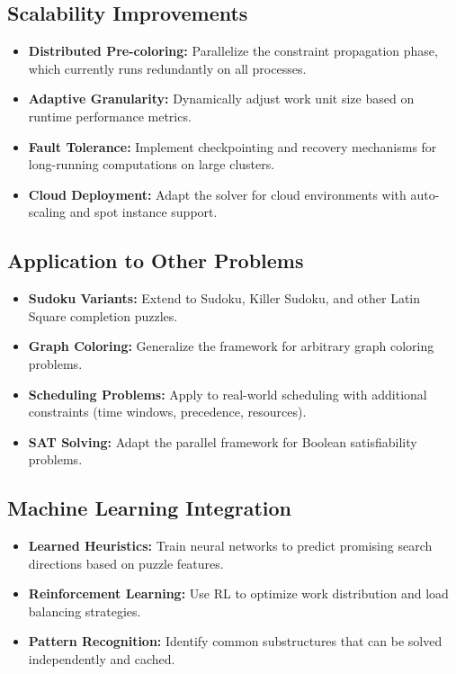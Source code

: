 \subsection{Scalability Improvements}
\begin{itemize}
    \item \textbf{Distributed Pre-coloring:} Parallelize the constraint propagation phase, which currently runs redundantly on all processes.
    
    \item \textbf{Adaptive Granularity:} Dynamically adjust work unit size based on runtime performance metrics.
    
    \item \textbf{Fault Tolerance:} Implement checkpointing and recovery mechanisms for long-running computations on large clusters.
    
    \item \textbf{Cloud Deployment:} Adapt the solver for cloud environments with auto-scaling and spot instance support.
\end{itemize}

\subsection{Application to Other Problems}
\begin{itemize}
    \item \textbf{Sudoku Variants:} Extend to Sudoku, Killer Sudoku, and other Latin Square completion puzzles.
    
    \item \textbf{Graph Coloring:} Generalize the framework for arbitrary graph coloring problems.
    
    \item \textbf{Scheduling Problems:} Apply to real-world scheduling with additional constraints (time windows, precedence, resources).
    
    \item \textbf{SAT Solving:} Adapt the parallel framework for Boolean satisfiability problems.
\end{itemize}

\subsection{Machine Learning Integration}
\begin{itemize}
    \item \textbf{Learned Heuristics:} Train neural networks to predict promising search directions based on puzzle features.
    
    \item \textbf{Reinforcement Learning:} Use RL to optimize work distribution and load balancing strategies.
    
    \item \textbf{Pattern Recognition:} Identify common substructures that can be solved independently and cached.
\end{itemize}

